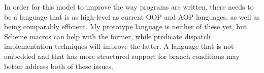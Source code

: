 \documentclass{article}
\begin{document}
In order for this model to improve the way programs are written, there
needs to be a language that is as high-level as current OOP and AOP
languages, as well as being comparably efficient.  My prototype
language is neither of these yet, but Scheme macros can help with the
former, while predicate dispatch implementation techniques will
improve the latter.  A language that is not embedded and that has more
structured support for branch conditions may better address both of
these issues.



\end{document}
